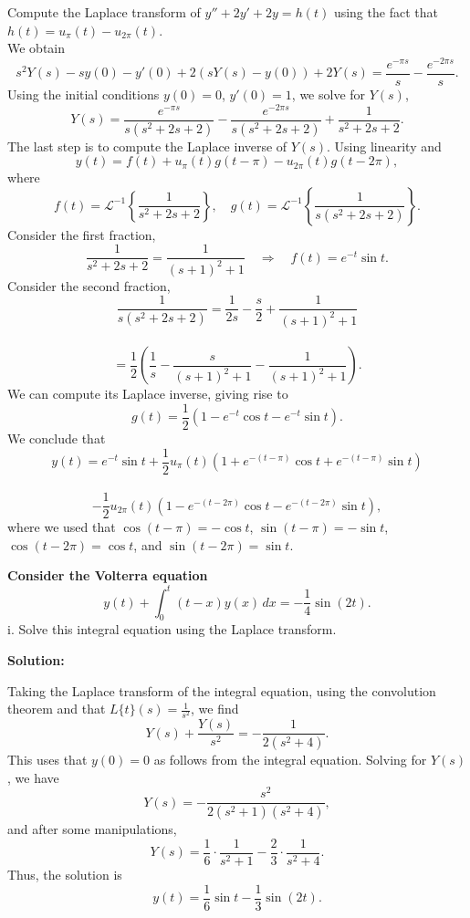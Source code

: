\documentclass[10pt,landscape]{article}
\begin{document}
\begin{multicols}{2}
Compute the Laplace transform of \( y'' + 2y' + 2y = h(t) \) using the fact that \( h(t) = u_\pi(t) - u_{2\pi}(t) \). \\

We obtain\\
\[
s^2 Y(s) - s y(0) - y'(0) + 2 \left( s Y(s) - y(0) \right) + 2 Y(s) = \frac{e^{-\pi s}}{s} - \frac{e^{-2\pi s}}{s}.
\]
Using the initial conditions \( y(0) = 0 \), \( y'(0) = 1 \), we solve for \( Y(s) \),\\
\[
Y(s) = \frac{e^{-\pi s}}{s(s^2 + 2s + 2)} - \frac{e^{-2\pi s}}{s(s^2 + 2s + 2)} + \frac{1}{s^2 + 2s + 2}.
\]
The last step is to compute the Laplace inverse of \( Y(s) \). Using linearity and\\
\[
y(t) = f(t) + u_\pi(t) g(t - \pi) - u_{2\pi}(t) g(t - 2\pi),
\]
where\\
\[
f(t) = \mathcal{L}^{-1}\left\{ \frac{1}{s^2 + 2s + 2} \right\}, \quad g(t) = \mathcal{L}^{-1}\left\{ \frac{1}{s(s^2 + 2s + 2)} \right\}.
\]
Consider the first fraction,\\
\[
\frac{1}{s^2 + 2s + 2} = \frac{1}{(s + 1)^2 + 1} \quad \Rightarrow \quad f(t) = e^{-t} \sin t.
\]
Consider the second fraction,\\
\[
\frac{1}{s(s^2 + 2s + 2)} = \frac{1}{2s} - \frac{s}{2} + \frac{1}{(s + 1)^2 + 1} \]\\\[= \frac{1}{2} \left( \frac{1}{s} - \frac{s}{(s + 1)^2 + 1} - \frac{1}{(s + 1)^2 + 1} \right).
\]
We can compute its Laplace inverse, giving rise to\\
\[
g(t) = \frac{1}{2} \left( 1 - e^{-t} \cos t - e^{-t} \sin t \right).
\]
We conclude that\\
\[
y(t) = e^{-t} \sin t + \frac{1}{2} u_\pi(t) \left( 1 + e^{-(t-\pi)} \cos t + e^{-(t-\pi)} \sin t \right)\]\\\[ - \frac{1}{2} u_{2\pi}(t) \left( 1 - e^{-(t-2\pi)} \cos t - e^{-(t-2\pi)} \sin t \right),
\]
where we used that \( \cos(t - \pi) = - \cos t \), \( \sin(t - \pi) = - \sin t \), \( \cos(t - 2\pi) = \cos t \), and \( \sin(t - 2\pi) = \sin t \).


\bigskip
\newpage
\textbf{Consider the Volterra equation}\\
\[
y(t) + \int_0^t (t - x) y(x) \, dx = - \frac{1}{4} \sin(2t).
\]
i. Solve this integral equation using the Laplace transform.

\textbf{Solution:}

Taking the Laplace transform of the integral equation, using the convolution
theorem and that \( L\{t\}(s) = \frac{1}{s^2} \), we find\\
\[
Y(s) + \frac{Y(s)}{s^2} = - \frac{1}{2(s^2 + 4)}.
\]
This uses that \( y(0) = 0 \) as follows from the integral equation. Solving for \( Y(s) \), we have
\\\[
Y(s) = - \frac{s^2}{2(s^2 + 1)(s^2 + 4)},
\]
and after some manipulations,\\
\[
Y(s) = \frac{1}{6} \cdot \frac{1}{s^2 + 1} - \frac{2}{3} \cdot \frac{1}{s^2 + 4}.
\]
Thus, the solution is\\
\[
y(t) = \frac{1}{6} \sin t - \frac{1}{3} \sin(2t).
\]


\end{multicols}
\end{document}
